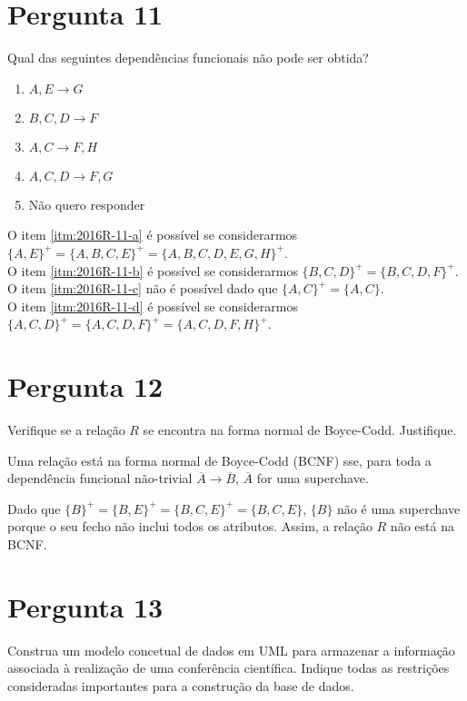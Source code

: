 {\section{Pergunta 11}
Qual das seguintes dependências funcionais não pode ser obtida?
\begin{enumerate}[label=\alph*.]\itemsep0em
    \item \label{itm:2016R-11-a} $A, E \rightarrow G$
    \item \label{itm:2016R-11-b} $B, C, D \rightarrow F$
    \item \label{itm:2016R-11-c} $A,C \rightarrow F,H$
    \item \label{itm:2016R-11-d} $A,C,D \rightarrow F,G$
    \item \label{itm:2016R-11-e} Não quero responder
\end{enumerate}
O item \ref{itm:2016R-11-a} é possível se considerarmos $\{A,E\}^+ = \{A,B,C,E\}^+ = \{A,B,C,D,E,G,H\}^+$.\\
O item \ref{itm:2016R-11-b} é possível se considerarmos $\{B,C,D\}^+ = \{B,C,D,F\}^+$.\\
O item \ref{itm:2016R-11-c} não é possível dado que $\{A,C\}^+ = \{A,C\}$.\\
O item \ref{itm:2016R-11-d} é possível se considerarmos $\{A,C,D\}^+ = \{A,C,D,F\}^+ = \{A,C,D,F,H\}^+$.

\section{Pergunta 12}
Verifique se a relação $R$ se encontra na forma normal de Boyce-Codd. Justifique.

\ansseparator

Uma relação está na forma normal de Boyce-Codd (BCNF) sse, para toda a dependência funcional não-trivial $\overline{A} \rightarrow \overline{B}$, $\overline{A}$ for uma superchave.

Dado que $\{B\}^+ = \{B,E\}^+ = \{B,C,E\}^+ = \{B,C,E\}$, $\{B\}$ não é uma superchave porque o seu fecho não inclui todos os atributos. Assim, a relação $R$ não está na BCNF.

\section{Pergunta 13}
Construa um modelo concetual de dados em UML para armazenar a informação associada à realização de uma conferência científica. Indique todas as restrições consideradas importantes para a construção da base de dados.

}
